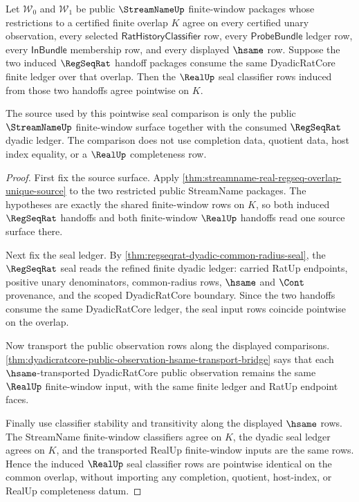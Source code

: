 \begin{theorem}
\label{thm:streamname-regseqrat-pointwise-seal-stability}
Let $\mathcal{W}_0$ and $\mathcal{W}_1$ be public $\StreamNameUp$
finite-window packages whose restrictions to a certified finite overlap $K$
agree on every certified unary observation, every selected
$\mathsf{RatHistoryClassifier}$ row, every $\mathsf{ProbeBundle}$ ledger row,
every $\mathsf{InBundle}$ membership row, and every displayed $\hsame$ row.
Suppose the two induced $\RegSeqRat$ handoff packages consume the same
DyadicRatCore finite ledger over that overlap. Then the $\RealUp$ seal
classifier rows induced from those two handoffs agree pointwise on $K$.

The source used by this pointwise seal comparison is only the public
$\StreamNameUp$ finite-window surface together with the consumed
$\RegSeqRat$ dyadic ledger. The comparison does not use completion data,
quotient data, host index equality, or a $\RealUp$ completeness row.
\end{theorem}
\begin{proof}
First fix the source surface. Apply
\autoref{thm:streamname-real-regseq-overlap-unique-source} to the two
restricted public StreamName packages. The hypotheses are exactly the shared
finite-window rows on $K$, so both induced $\RegSeqRat$ handoffs and both
finite-window $\RealUp$ handoffs read one source surface there.

Next fix the seal ledger. By
\autoref{thm:regseqrat-dyadic-common-radius-seal}, the $\RegSeqRat$ seal reads
the refined finite dyadic ledger: carried RatUp endpoints, positive unary
denominators, common-radius rows, $\hsame$ and $\Cont$ provenance, and the
scoped DyadicRatCore boundary. Since the two handoffs consume the same
DyadicRatCore ledger, the seal input rows coincide pointwise on the overlap.

Now transport the public observation rows along the displayed comparisons.
\autoref{thm:dyadicratcore-public-observation-hsame-transport-bridge} says
that each $\hsame$-transported DyadicRatCore public observation remains the
same $\RealUp$ finite-window input, with the same finite ledger and RatUp
endpoint faces.

Finally use classifier stability and transitivity along the displayed
$\hsame$ rows. The StreamName finite-window classifiers agree on $K$, the
dyadic seal ledger agrees on $K$, and the transported RealUp finite-window
inputs are the same rows. Hence the induced $\RealUp$ seal classifier rows are
pointwise identical on the common overlap, without importing any completion,
quotient, host-index, or RealUp completeness datum.
\end{proof}

